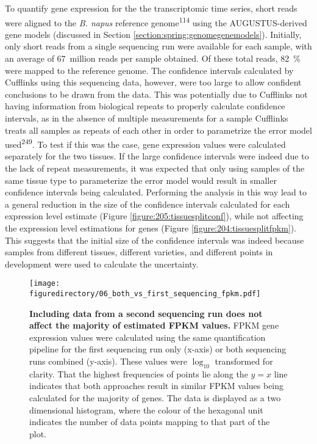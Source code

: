 \documentclass[12pt,]{book}
\begin{document}
To quantify gene expression for the the transcriptomic time series,
short reads were aligned to the \emph{B. napus} reference
genome\textsuperscript{114} using the AUGUSTUS-derived gene models
(discussed in Section \ref{section:spring:genomegenemodels}). Initially,
only short reads from a single sequencing run were available for each
sample, with an average of 67~million reads per sample obtained. Of
these total reads, 82~\% were mapped to the reference genome. The
confidence intervals calculated by Cufflinks using this sequencing data,
however, were too large to allow confident conclusions to be drawn from
the data. This was potentially due to Cufflinks not having information
from biological repeats to properly calculate confidence intervals, as
in the absence of multiple measurements for a sample Cufflinks treats
all samples as repeats of each other in order to parametrize the error
model used\textsuperscript{249}. To test if this was the case, gene
expression values were calculated separately for the two tissues. If the
large confidence intervals were indeed due to the lack of repeat
measurements, it was expected that only using samples of the same tissue
type to parameterize the error model would result in smaller confidence
intervals being calculated. Performing the analysis in this way lead to
a general reduction in the size of the confidence intervals calculated
for each expression level estimate (Figure
\ref{figure:205:tissuesplitconf}), while not affecting the expression
level estimations for genes (Figure \ref{figure:204:tissuesplitfpkm}).
This suggests that the initial size of the confidence intervals was
indeed because samples from different tissues, different varieties, and
different points in development were used to calculate the uncertainty.

\begin{figure}[htbp]
\centering
\texttt{[image: figuredirectory/06\_both\_vs\_first\_sequencing\_fpkm.pdf]}
\caption{\textbf{Including data from a second sequencing run does not
affect the majority of estimated FPKM values.} FPKM gene expression
values were calculated using the same quantification pipeline for the
first sequencing run only (x-axis) or both sequencing runs combined
(y-axis). These values were \(\log_{10}\) transformed for clarity. That
the highest frequencies of points lie along the \(y = x\) line indicates
that both approaches result in similar FPKM values being calculated for
the majority of genes. The data is displayed as a two dimensional
histogram, where the colour of the hexagonal unit indicates the number
of data points mapping to that part of the
plot.}\label{figure:206:repsfpkm}
\end{figure}
\end{document}
